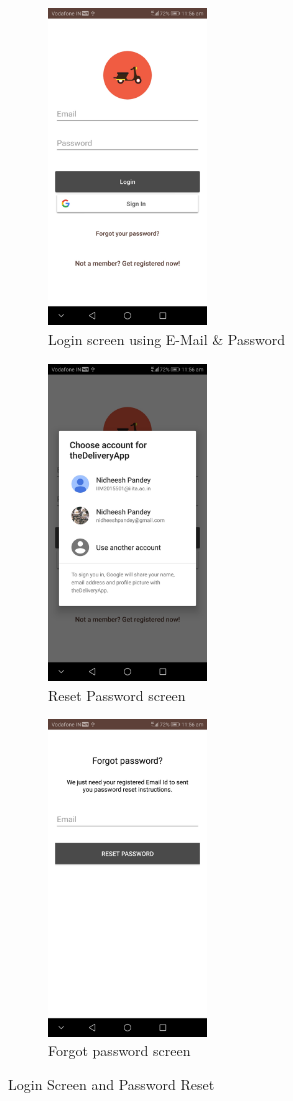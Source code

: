 \documentclass{report}
\begin{document}
\begin{figure}[h!]
\begin{subfigure}[b]{.26\textwidth}
\centering
\includegraphics[width=4.2cm]{login.jpg}
\caption{\centering \tiny Login screen using E-Mail \& Password}
\end{subfigure}
\begin{subfigure}[b]{.26\textwidth}
\centering
\includegraphics[width=4.2cm]{google_signin.jpg}
\caption{\centering \tiny Reset Password screen}
\end{subfigure}
\begin{subfigure}[b]{.26\textwidth}
\centering
\includegraphics[width=4.2cm]{forgot_password.jpg}
\caption{\centering \tiny Forgot password screen}
\end{subfigure}
\caption{\tiny Login Screen and Password Reset} 
\label{fig:NASA_Logo}
\end{figure}
\end{document}
